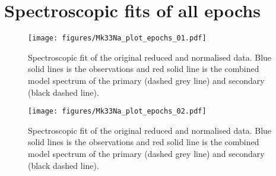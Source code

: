 \documentclass[fleqn,usenatbib]{mnras}
\begin{document}



\section{Spectroscopic fits of all epochs}

\begin{figure*}
	\texttt{[image: figures/Mk33Na\_plot\_epochs\_01.pdf]}
    \caption{Spectroscopic fit of the original reduced and normalised data. Blue solid lines is the observations and red solid line is the combined model spectrum of the primary (dashed grey line) and secondary (black dashed line).}
\end{figure*}


\begin{figure*}	
	\texttt{[image: figures/Mk33Na\_plot\_epochs\_02.pdf]}
	\caption{Spectroscopic fit of the original reduced and normalised data. Blue solid lines is the observations and red solid line is the combined model spectrum of the primary (dashed grey line) and secondary (black dashed line).\label{f:largest_sep}}
\end{figure*}
\end{document}
